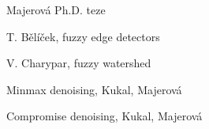 \begin{thebibliography}{9}
        Majerová Ph.D. teze

        T. Bělíček, fuzzy edge detectors

        V. Charypar, fuzzy watershed
        
        Minmax denoising, Kukal, Majerová
        
        Compromise denoising, Kukal, Majerová

\end{thebibliography} 